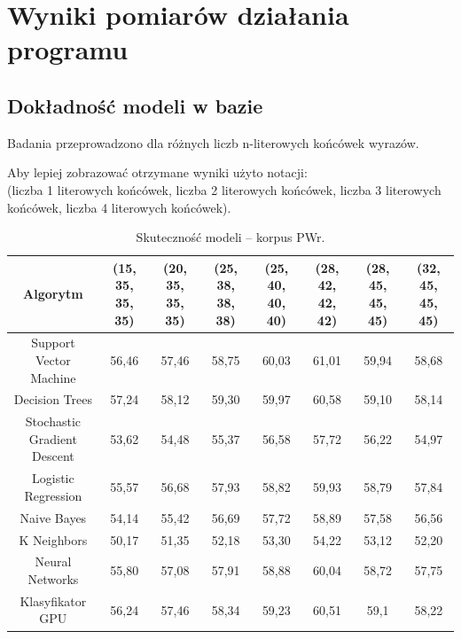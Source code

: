 \section{Wyniki pomiarów działania programu}
\subsection{Dokładność modeli w bazie}
Badania przeprowadzono dla różnych liczb n-literowych końcówek wyrazów. 
\begin{landscape}
	\noindent Aby lepiej zobrazować otrzymane wyniki użyto notacji:\\ (liczba 1 literowych końcówek, liczba 2 literowych końcówek, liczba 3 literowych końcówek, liczba 4 literowych końcówek).
	\begin{table}[H]
		\centering
		\caption{Skuteczność modeli -- korpus PWr.}
		\begin{tabular}{cccccccc}
			\toprule
			\textbf{Algorytm} & \textbf{(15, 35, 35, 35)} & \textbf{(20, 35, 35, 35)} & \textbf{(25, 38, 38, 38)} & \textbf{(25, 40, 40, 40)} & \textbf{(28, 42, 42, 42)} & \textbf{(28, 45, 45, 45)} & \textbf{(32, 45, 45, 45)} \\
			\midrule
			Support Vector Machine & 56,46 & 57,46 & 58,75 & 60,03 & 61,01 & 59,94 & 58,68 \\
			Decision Trees & 57,24 & 58,12 & 59,30 & 59,97 & 60,58 & 59,10 & 58,14 \\
			Stochastic Gradient Descent & 53,62 & 54,48 & 55,37 & 56,58 & 57,72 & 56,22 & 54,97 \\
			Logistic Regression & 55,57 & 56,68 & 57,93 & 58,82 & 59,93 & 58,79 & 57,84 \\
			Naive Bayes & 54,14 & 55,42 & 56,69 & 57,72 & 58,89 & 57,58 & 56,56 \\
			K Neighbors & 50,17 & 51,35 & 52,18 & 53,30 & 54,22 & 53,12 & 52,20 \\
			Neural Networks & 55,80 & 57,08 & 57,91 & 58,88 & 60,04 & 58,72 & 57,75 \\ 
			Klasyfikator GPU & 56,24 & 57,46 & 58,34 & 59,23 & 60,51 & 59,1 & 58,22 \\
			\bottomrule
		\end{tabular}
	\end{table}
	

\end{landscape}
